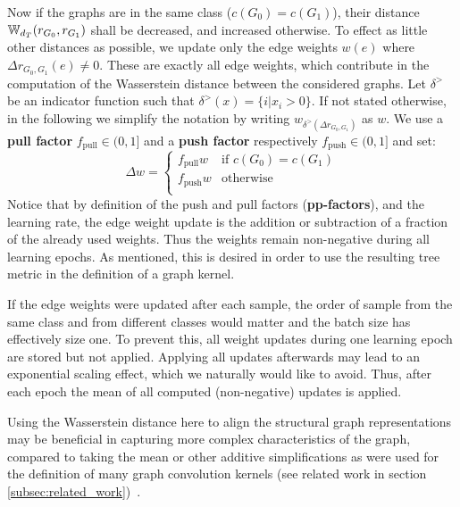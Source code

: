 	Now if the graphs are in the same class ($c(G_0) = c(G_1)$), their distance $\mathbb{W}_{d_T}( r_{G_0}, r_{G_1} )$ shall be decreased, and increased otherwise.
	To effect as little other distances as possible, we update only the edge weights $w(e)$ where $\Delta r_{G_0, G_1}(e) \neq 0$.
	These are exactly all edge weights, which contribute in the computation of the Wasserstein distance between the considered graphs.
	Let $\delta^>$ be an indicator function such that $\delta^>(x)=\{i| x_i>0 \}$.
	If not stated otherwise, in the following we simplify the notation by writing ${w}_{\delta^>(\Delta r_{G_0, G_1})}$ as $w$.
	We use a \textbf{pull factor} $f_{\text{pull}}\in(0,1]$ and a \textbf{push factor} respectively $f_{\text{push}} \in(0,1]$ and set:
	\begin{equation} \label{eq:DeltaW}
		\Delta w = \begin{cases}
			f_{\text{pull}} w &\text{if } c(G_0) = c(G_1)\\
			f_{\text{push}} w &\text{otherwise}\\
		\end{cases}
	\end{equation}
	Notice that by definition of the push and pull factors (\textbf{pp-factors}), and the learning rate, the edge weight update is the addition or subtraction of a fraction of the already used weights.
	Thus the weights remain non-negative during all learning epochs.
	As mentioned, this is desired in order to use the resulting tree metric in the definition of a graph kernel.
	
	If the edge weights were updated after each sample, the order of sample from the same class and from different classes would matter and the batch size has effectively size one.
	To prevent this, all weight updates during one learning epoch are stored but not applied.
	Applying all updates afterwards may lead to an exponential scaling effect, which we naturally would like to avoid.
	Thus, after each epoch the mean of all computed (non-negative) updates is applied.
	
	Using the Wasserstein distance here to align the structural graph representations may be beneficial in capturing more complex characteristics of the graph, compared to taking the mean or other additive simplifications as were used for the definition of many graph convolution kernels (see related work in section \ref{subsec:related_work})~\cite{2019_Togninalli_NIPS}.
	
